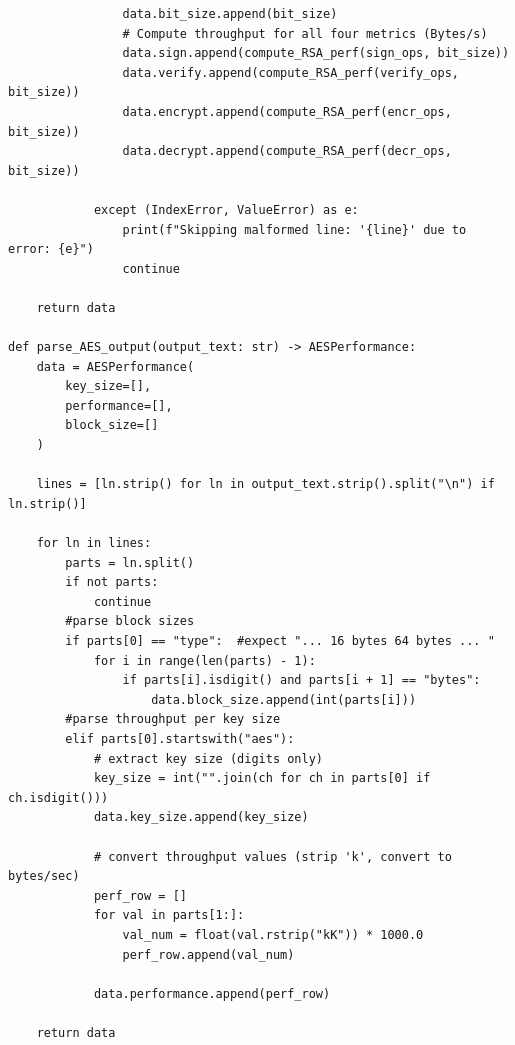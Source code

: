 \documentclass[11pt]{article}
\begin{document}
\begin{framed}
\begin{verbatim}
                data.bit_size.append(bit_size)
                # Compute throughput for all four metrics (Bytes/s)
                data.sign.append(compute_RSA_perf(sign_ops, bit_size))
                data.verify.append(compute_RSA_perf(verify_ops, bit_size))
                data.encrypt.append(compute_RSA_perf(encr_ops, bit_size))
                data.decrypt.append(compute_RSA_perf(decr_ops, bit_size))

            except (IndexError, ValueError) as e:
                print(f"Skipping malformed line: '{line}' due to error: {e}")
                continue

    return data

def parse_AES_output(output_text: str) -> AESPerformance:
    data = AESPerformance(
        key_size=[],
        performance=[],
        block_size=[]
    )

    lines = [ln.strip() for ln in output_text.strip().split("\n") if ln.strip()]

    for ln in lines:
        parts = ln.split()
        if not parts:
            continue
        #parse block sizes
        if parts[0] == "type":  #expect "... 16 bytes 64 bytes ... "
            for i in range(len(parts) - 1):
                if parts[i].isdigit() and parts[i + 1] == "bytes":
                    data.block_size.append(int(parts[i]))
        #parse throughput per key size
        elif parts[0].startswith("aes"):
            # extract key size (digits only)
            key_size = int("".join(ch for ch in parts[0] if ch.isdigit()))
            data.key_size.append(key_size)

            # convert throughput values (strip 'k', convert to bytes/sec)
            perf_row = []
            for val in parts[1:]:
                val_num = float(val.rstrip("kK")) * 1000.0
                perf_row.append(val_num)

            data.performance.append(perf_row)

    return data

\end{verbatim}
\end{framed}
\end{document}
